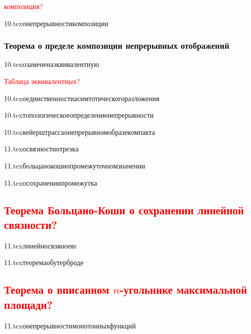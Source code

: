 
\textcolor{red}{композиция?}

{10.tex}{онепрерывностикомпозиции}

\subsubsection{Теорема о пределе композиции непрерывных отображений}


{10.tex}{озамененаэквивалентную}

\textcolor{red}{Таблица эквивалентных?}

{10.tex}{оединственностиасимтотическогоразложения}

{10.tex}{топологическоеопределениенепрерывности}

{10.tex}{вейерштрассаонепрерывномобразекомпакта}


{11.tex}{освязностиотрезка}

{11.tex}{больцанокошиопромежуточномзначении}

{11.tex}{осохранениипромежутка}

\subsection{\textcolor{red}{Теорема Больцано-Коши о сохранении линейной связности?}}

{11.tex}{линейносвзяноевr}

{11.tex}{теоремаобутерброде}

\subsection{\textcolor{red}{Теорема о вписанном $n$-угольнике максимальной площади?}}

{11.tex}{онепрерывностимонотонныхфункций}


